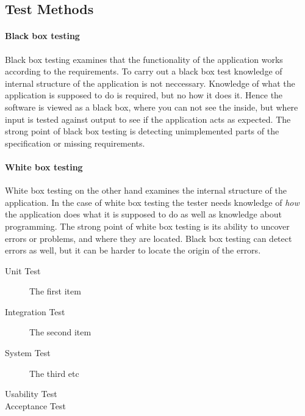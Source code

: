 \subsection{Test Methods}

\paragraph{Black box testing}

Black box testing examines that the functionality of the application works according to the requirements. To carry out a black box test knowledge of internal structure of the application is not neccessary. Knowledge of what the application is supposed to do is required, but no how it does it. Hence the software is viewed as a black box, where you can not see the inside, but where input is tested against output to see if the application acts as expected. The strong point of black box testing is detecting unimplemented parts of the specification or missing requirements.

\paragraph{White box testing}

White box testing on the other hand examines the internal structure of the application. In the case of white box testing the tester needs knowledge of \emph{how} the application does what it is supposed to do as well as knowledge about programming. The strong point of white box testing is its ability to uncover errors or problems, and where they are located. Black box testing can detect errors as well, but it can be harder to locate the origin of the errors.

\begin{description}
  \item[Unit Test] The first item
  \item[Integration Test] The second item
  \item[System Test] The third etc
  \item[Usability Test]
  \item[Acceptance Test]
\end{description}